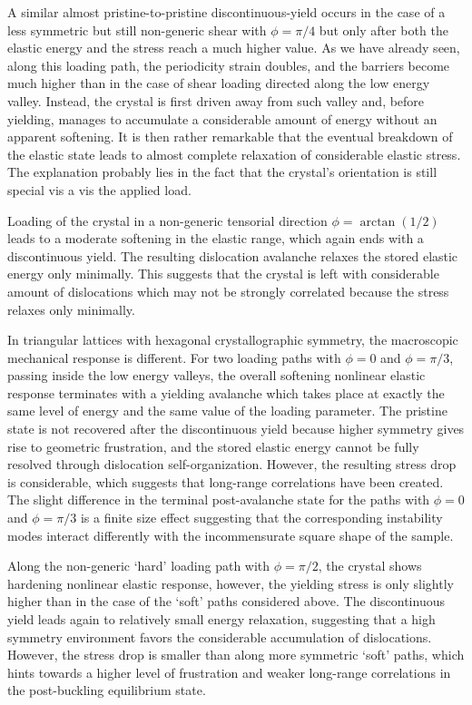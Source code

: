 \documentclass[CRPHYS,Unicode,manuscript]{cedram}
\begin{document}
A similar almost pristine-to-pristine discontinuous-yield occurs in the case of a less symmetric but still non-generic shear with $\phi=\pi/4$ but only after both the elastic energy and the stress reach a much higher value. As we have already seen, along this loading path, the periodicity strain doubles, and the barriers become much higher than in the case of shear loading directed along the low energy valley.  Instead, the crystal is first driven away from such valley and, before yielding, manages to accumulate a considerable amount of energy without an apparent softening. It is then rather remarkable that the eventual breakdown of the elastic state leads to almost complete relaxation of considerable elastic stress. The explanation probably lies in the fact that the crystal's orientation is still special vis a vis the applied load. 

Loading of the crystal in a non-generic tensorial direction $\phi=\arctan (1/2)$ leads to a moderate softening in the elastic range, which again ends with a discontinuous yield. The resulting dislocation avalanche relaxes the stored elastic energy only minimally.  This suggests that the crystal is left with considerable amount of dislocations which may not be  strongly correlated  because the stress relaxes only minimally.

In triangular lattices with hexagonal crystallographic symmetry, the macroscopic mechanical response is different. For two loading paths with $\phi=0$ and $\phi=\pi/3$, passing inside the low energy valleys,  the overall softening nonlinear elastic response terminates with a yielding avalanche which takes place at exactly the same level of energy and the same value of the loading parameter. The pristine state is not recovered after the discontinuous yield because higher symmetry gives rise to geometric frustration, and the stored elastic energy cannot be fully resolved through dislocation self-organization. However, the resulting stress drop is considerable, which suggests that long-range correlations have been created. The slight difference in the terminal post-avalanche state for the paths with $\phi=0$ and $\phi=\pi/3$ is a finite size effect suggesting that the corresponding instability modes interact differently with the incommensurate square shape of the sample.

Along the non-generic `hard' loading path with $\phi=\pi/2$, the crystal shows hardening nonlinear elastic response, however, the yielding stress is only slightly higher than in the case of the `soft' paths considered above. The discontinuous yield leads again to relatively small energy relaxation, suggesting that a high symmetry environment favors the considerable accumulation of dislocations. However, the stress drop is smaller than along more symmetric `soft' paths, which hints towards a higher level of frustration and weaker long-range correlations in the post-buckling equilibrium state.
\end{document}
